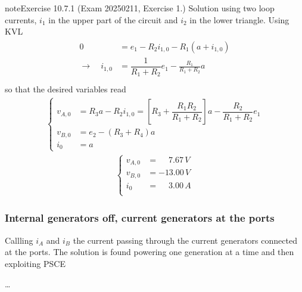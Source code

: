 \documentclass[letterpaper,10pt,italian]{jupyterBook}
\begin{document}
\begin{sphinxadmonition}{note}{Exercise 10.7.1 (Exam 2025\sphinxhyphen{}02\sphinxhyphen{}11, Exercise 1.)}
\sphinxAtStartPar
Solution using two loop currents, \(i_1\) in the upper part of the circuit and \(i_2\) in the lower triangle. Using KVL
\begin{equation*}
\begin{split}\begin{aligned}
  0 & = e_1 - R_2 i_{1,0} - R_1 (a + i_{1,0}) \\
  \rightarrow \quad i_{1,0} & = \dfrac{1}{R_1+R_2} e_1 - \frac{R_1}{R_1 + R_2} a \\
\end{aligned}\end{split}
\end{equation*}
\sphinxAtStartPar
so that the desired variables read
\begin{equation*}
\begin{split}\begin{cases}
  v_{A,0} & = R_3 a - R_2 i_{1,0} = \left[ R_3 + \dfrac{R_1 R_2}{R_1 + R_2} \right] a - \dfrac{R_2}{R_1+R_2} e_1 \\
  v_{B,0} & = e_2 - (R_3 + R_4) a \\
  i_{0} & = a
\end{cases}\end{split}
\end{equation*}\begin{equation*}
\begin{split}\begin{cases}
 v_{A,0} & = \quad\ 7.67 \, V \\
 v_{B,0} & =      -13.00 \, V \\
   i_{0} & = \quad\ 3.00 \, A \\
\end{cases}\end{split}
\end{equation*}
\begin{figure}[htbp]
\centering

\noindent{}
\end{figure}
\subsubsection*{Internal generators off, current generators at the ports}

\sphinxAtStartPar
Callling \(i_A\) and \(i_B\) the current passing through the current generators connected at the ports. The solution is found powering one generation at a time and then exploiting PSCE

\sphinxAtStartPar
{} …


\end{sphinxadmonition}
\end{document}
